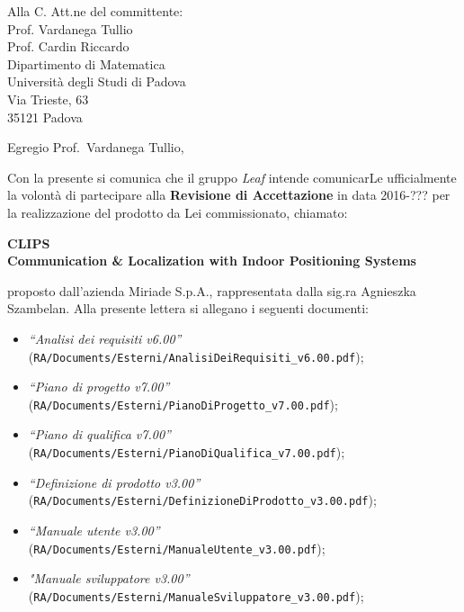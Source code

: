 \documentclass[a4paper,12pt]{letteracdp}
\author{Davide Castello}
\date{16 maggio 2016}
\begin{document}
	\begin{letter}{
		Alla C. Att.ne del committente: \\
		Prof. Vardanega Tullio \\
		Prof. Cardin Riccardo \\
		Dipartimento di Matematica \\
		Università degli Studi di Padova \\
		Via Trieste, 63 \\
		35121 Padova}
		
		\opening{Egregio Prof.~Vardanega Tullio,}
		Con la presente si comunica che il gruppo \textit{Leaf} intende comunicarLe ufficialmente la volontà di partecipare alla \textbf{Revisione di Accettazione} in data 2016-??? per la realizzazione del prodotto da Lei commissionato, chiamato:
\begin{center}
	\textbf{CLIPS \\ Communication \& Localization with Indoor Positioning Systems}
\end{center}
proposto dall'azienda Miriade S.p.A., rappresentata dalla sig.ra Agnieszka Szambelan.
Alla presente lettera si allegano i seguenti documenti:
%
\begin{itemize}
	\item \textit{“Analisi dei requisiti v6.00”} \\(\texttt{RA/Documents/Esterni/AnalisiDeiRequisiti\_v6.00.pdf});

	\item \textit{“Piano di progetto v7.00”} \\(\texttt{RA/Documents/Esterni/PianoDiProgetto\_v7.00.pdf});

	\item \textit{“Piano di qualifica v7.00”} \\(\texttt{RA/Documents/Esterni/PianoDiQualifica\_v7.00.pdf});
	
	\item \textit{“Definizione di prodotto v3.00”} \\(\texttt{RA/Documents/Esterni/DefinizioneDiProdotto\_v3.00.pdf});
	
	\item \textit{“Manuale utente v3.00”} \\(\texttt{RA/Documents/Esterni/ManualeUtente\_v3.00.pdf});
	
	\item \textit{"Manuale sviluppatore v3.00”} \\(\texttt{RA/Documents/Esterni/ManualeSviluppatore\_v3.00.pdf});
	

\end{itemize}
\end{letter}
\end{document}
